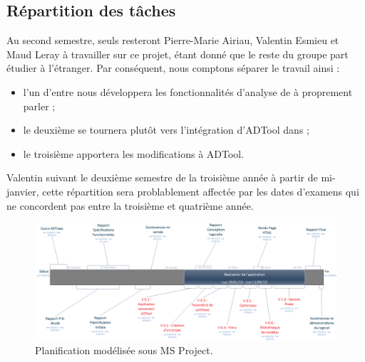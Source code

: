    \subsection{Répartition des tâches}
        Au second semestre, seuls resteront Pierre-Marie {\sc Airiau}, Valentin {\sc Esmieu} et Maud {\sc Leray} à travailler sur ce projet, étant donné que le reste du groupe part étudier à l'étranger. Par conséquent, nous comptons séparer le travail ainsi :
        \begin{itemize} 
            \item l'un d'entre nous développera les fonctionnalités d'analyse de \glasir{} à proprement parler ;
            \item le deuxième se tournera plutôt vers l'intégration d'ADTool dans \glasir{} ;
            \item le troisième apportera les modifications à ADTool.
        \end{itemize} 
        Valentin suivant le deuxième semestre de la troisième année à partir de mi-janvier, cette répartition sera problablement affectée par les dates d'examens qui ne concordent pas entre la troisième et quatrième année. %

        \begin{landscape}
            \begin{figure}
                \centering
                \includegraphics[height=0.60\textwidth]{figure/planification.png}
                \caption{Planification modélisée sous MS Project.}
                \label{fig:planif}
            \end{figure}
        \end{landscape}

